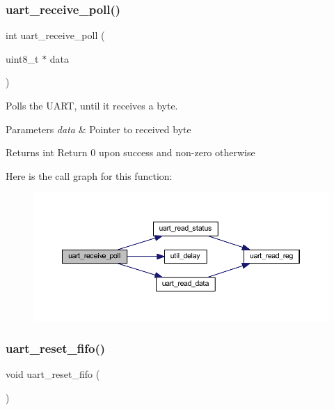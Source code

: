 \mbox{\label{group__uart_gab2675dc6d0e0ebd9c51d3372a907ba55}} 
\subsubsection{\texorpdfstring{uart\+\_\+receive\+\_\+poll()}{uart\_receive\_poll()}}
{\footnotesize\ttfamily int uart\+\_\+receive\+\_\+poll (\begin{DoxyParamCaption}\item[{uint8\+\_\+t $\ast$}]{data }\end{DoxyParamCaption})}



Polls the U\+A\+RT, until it receives a byte. 


\begin{DoxyParams}{Parameters}
{\em data} & Pointer to received byte \\
\hline
\end{DoxyParams}
\begin{DoxyReturn}{Returns}
int Return 0 upon success and non-\/zero otherwise 
\end{DoxyReturn}
Here is the call graph for this function\+:\nopagebreak
\begin{figure}[H]
\begin{center}
\leavevmode
\includegraphics[width=350pt]{group__uart_gab2675dc6d0e0ebd9c51d3372a907ba55_cgraph}
\end{center}
\end{figure}
\mbox{\label{group__uart_ga63d2125ea0329330a0efd87bb7f4a42f}} 
\subsubsection{\texorpdfstring{uart\+\_\+reset\+\_\+fifo()}{uart\_reset\_fifo()}}
{\footnotesize\ttfamily void uart\+\_\+reset\+\_\+fifo (\begin{DoxyParamCaption}{ }\end{DoxyParamCaption})}



